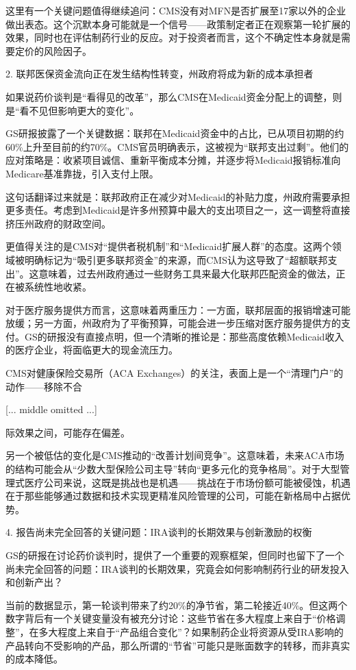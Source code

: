 \documentclass[11pt]{ctexart}
\begin{document}
这里有一个关键问题值得继续追问：CMS没有对MFN是否扩展至17家以外的企业做出表态。这个沉默本身可能就是一个信号——政策制定者正在观察第一轮扩展的效果，同时也在评估制药行业的反应。对于投资者而言，这个不确定性本身就是需要定价的风险因子。

2. 联邦医保资金流向正在发生结构性转变，州政府将成为新的成本承担者

如果说药价谈判是“看得见的改革”，那么CMS在Medicaid资金分配上的调整，则是“看不见但影响更大的变化”。

GS研报披露了一个关键数据：联邦在Medicaid资金中的占比，已从项目初期的约60\%上升至目前的约70\%。CMS官员明确表示，这被视为“联邦支出过剩”。他们的应对策略是：收紧项目诚信、重新平衡成本分摊，并逐步将Medicaid报销标准向Medicare基准靠拢，引入支付上限。

这句话翻译过来就是：联邦政府正在减少对Medicaid的补贴力度，州政府需要承担更多责任。考虑到Medicaid是许多州预算中最大的支出项目之一，这一调整将直接挤压州政府的财政空间。

更值得关注的是CMS对“提供者税机制”和“Medicaid扩展人群”的态度。这两个领域被明确标记为“吸引更多联邦资金”的来源，而CMS认为这导致了“超额联邦支出”。这意味着，过去州政府通过一些财务工具来最大化联邦匹配资金的做法，正在被系统性地收紧。

对于医疗服务提供方而言，这意味着两重压力：一方面，联邦层面的报销增速可能放缓；另一方面，州政府为了平衡预算，可能会进一步压缩对医疗服务提供方的支付。GS的研报没有直接点明，但一个清晰的推论是：那些高度依赖Medicaid收入的医疗企业，将面临更大的现金流压力。

CMS对健康保险交易所（ACA Exchanges）的关注，表面上是一个“清理门户”的动作——移除不合

[... middle omitted ...]

际效果之间，可能存在偏差。

另一个被低估的变化是CMS推动的“改善计划间竞争”。这意味着，未来ACA市场的结构可能会从“少数大型保险公司主导”转向“更多元化的竞争格局”。对于大型管理式医疗公司来说，这既是挑战也是机遇——挑战在于市场份额可能被侵蚀，机遇在于那些能够通过数据和技术实现更精准风险管理的公司，可能在新格局中占据优势。

4. 报告尚未完全回答的关键问题：IRA谈判的长期效果与创新激励的权衡

GS的研报在讨论药价谈判时，提供了一个重要的观察框架，但同时也留下了一个尚未完全回答的问题：IRA谈判的长期效果，究竟会如何影响制药行业的研发投入和创新产出？

当前的数据显示，第一轮谈判带来了约20\%的净节省，第二轮接近40\%。但这两个数字背后有一个关键变量没有被充分讨论：这些节省在多大程度上来自于“价格调整”，在多大程度上来自于“产品组合变化”？如果制药企业将资源从受IRA影响的产品转向不受影响的产品，那么所谓的“节省”可能只是账面数字的转移，而非真实的成本降低。
\end{document}
